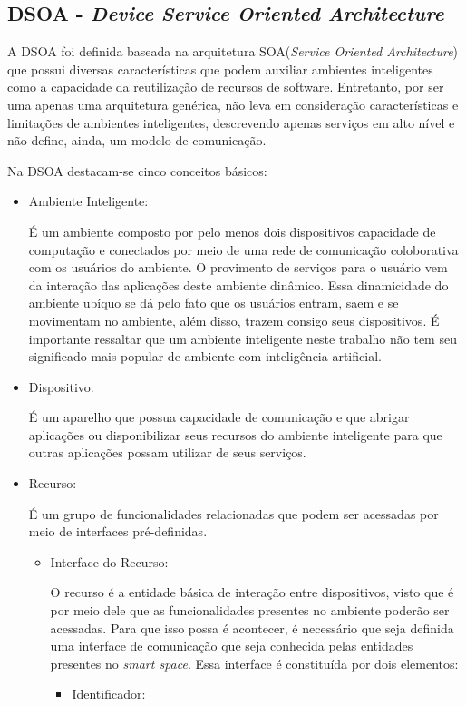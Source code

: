 \subsection{DSOA - \emph{Device Service Oriented Architecture}}

A DSOA foi definida baseada na arquitetura SOA(\emph{Service Oriented Architecture}) que possui diversas características que podem auxiliar ambientes inteligentes como a capacidade da reutilização de recursos de software. Entretanto, por ser uma apenas uma arquitetura genérica, não leva em consideração características e limitações de ambientes inteligentes, descrevendo apenas serviços em alto nível e não define, ainda, um modelo de comunicação.

Na DSOA destacam-se cinco conceitos básicos:

\begin{itemize}
	\item Ambiente Inteligente:

		É um ambiente composto por pelo menos dois dispositivos capacidade de computação e conectados por meio de uma rede de comunicação coloborativa com os usuários do ambiente. O provimento de serviços para o usuário vem da interação das aplicações deste ambiente dinâmico. Essa dinamicidade do ambiente ubíquo se dá pelo fato que os usuários entram, saem e se movimentam no ambiente, além disso, trazem consigo seus dispositivos. É importante ressaltar que um ambiente inteligente neste trabalho não tem seu significado mais popular de ambiente com inteligência artificial.
	\item Dispositivo:

		É um aparelho que possua capacidade de comunicação e que abrigar aplicações ou disponibilizar seus recursos do ambiente inteligente para que outras aplicações possam utilizar de seus serviços.
	\item Recurso:

		É um grupo de funcionalidades relacionadas que podem ser acessadas por meio de interfaces pré-definidas.
		\begin{itemize}
			\item Interface do Recurso:

				O recurso é a entidade básica de interação entre dispositivos, visto que é por meio dele que as funcionalidades presentes no ambiente poderão ser acessadas. Para que isso possa é acontecer, é necessário que seja definida uma interface de comunicação que seja conhecida pelas entidades presentes no \emph{smart space}. Essa interface é constituída por dois elementos:
				\begin{itemize}
					\item Identificador:


\end{itemize}
\end{itemize}
\end{itemize}
